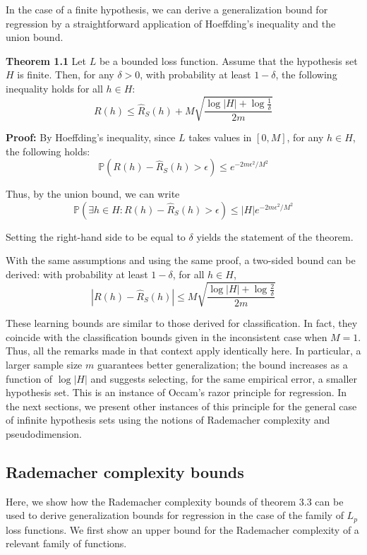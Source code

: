 \documentclass[fleqn,10pt]{olplainarticle}
\begin{document}
In the case of a finite hypothesis, we can derive a generalization bound for regression by a straightforward application of Hoeffding's inequality and the union bound.

\textbf{Theorem 1.1} Let $L$ be a bounded loss function. Assume that the hypothesis set $H$ is finite. Then, for any $\delta > 0$, with probability at least $1 - \delta$, the following inequality holds for all $h \in H$:
\[ R(h) \leq \hat{R}_S(h) + M \sqrt{\frac{\log |H| + \log \frac{1}{\delta}}{2m}} \]

\textbf{Proof:} By Hoeffding's inequality, since $L$ takes values in $[0, M]$, for any $h \in H$, the following holds:
\[ \mathbb{P}\left(R(h) - \hat{R}_S(h) > \epsilon\right) \leq e^{-2m\epsilon^2 / M^2} \]

Thus, by the union bound, we can write
\[ \mathbb{P}\left(\exists h \in H : R(h) - \hat{R}_S(h) > \epsilon\right) \leq |H|e^{-2m\epsilon^2 / M^2} \]

Setting the right-hand side to be equal to $\delta$ yields the statement of the theorem.

With the same assumptions and using the same proof, a two-sided bound can be derived: with probability at least $1 - \delta$, for all $h \in H$,
\[ |R(h) - \hat{R}_S(h)| \leq M \sqrt{\frac{\log |H| + \log \frac{2}{\delta}}{2m}} \]

These learning bounds are similar to those derived for classification. In fact, they coincide with the classification bounds given in the inconsistent case when $M = 1$. Thus, all the remarks made in that context apply identically here. In particular, a larger sample size $m$ guarantees better generalization; the bound increases as a function of $\log |H|$ and suggests selecting, for the same empirical error, a smaller hypothesis set. This is an instance of Occam's razor principle for regression. In the next sections, we present other instances of this principle for the general case of infinite hypothesis sets using the notions of Rademacher complexity and pseudodimension.

\subsection{Rademacher complexity bounds}

Here, we show how the Rademacher complexity bounds of theorem 3.3 can be used to derive generalization bounds for regression in the case of the family of $L_p$ loss functions. We first show an upper bound for the Rademacher complexity of a relevant family of functions.
\end{document}
